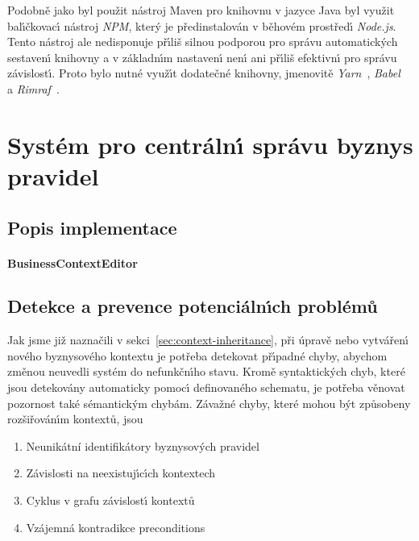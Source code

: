 Podobně jako byl použit nástroj Maven pro knihovnu v jazyce Java byl
využit bal\'{\i}čkovac\'{\i} nástroj \textit{NPM}, kter\'y je předinstalován
v běhovém prostřed\'{\i} \textit{Node.js}. Tento nástroj ale nedisponuje
př\'{\i}liš silnou podporou pro správu automatick\'ych sestaven\'{\i} knihovny
a v základn\'{\i}m nastaven\'{\i} nen\'{\i} ani př\'{\i}liš efektivn\'{\i} pro správu závislost\'{\i}.
Proto bylo nutné využ\'{\i}t dodatečné knihovny, jmenovitě
\textit{Yarn}~\cite{yarnpkg}, \textit{Babel}~\cite{babel} a
\textit{Rimraf}~\cite{rimraf}.

\section{Systém pro centráln\'{\i} správu byznys pravidel}\label{sec:central-administration}



\subsection{Popis implementace}

\paragraph{BusinessContextEditor} %

\subsection{Detekce a prevence potenciáln\'{\i}ch problémů}

Jak jsme již naznačili v sekci~\ref{sec:context-inheritance},
při úpravě nebo vytvářen\'{\i} nového byznysového kontextu je
potřeba detekovat př\'{\i}padné chyby, abychom změnou neuvedli
systém do nefunkčn\'{\i}ho stavu. Kromě syntaktick\'ych chyb,
které jsou detekovány automaticky pomoc\'{\i} definovaného schematu,
je potřeba věnovat pozornost také sémantick\'ym chybám.
Závažné chyby, které mohou b\'yt způsobeny rozšiřován\'{\i}m kontextů, jsou
\begin{enumerate}[label=\alph*)]
    \item Neunikátní identifikátory byznysových pravidel
    \item Závislosti na neexistuj\'{\i}c\'{\i}ch kontextech
    \item Cyklus v grafu závislost\'{\i} kontextů
    \item Vzájemná kontradikce preconditions
\end{enumerate}

